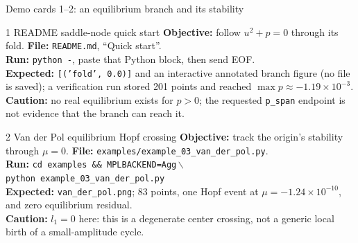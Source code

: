 \begin{frame}{Demo cards 1--2: an equilibrium branch and its stability}
\scriptsize
\begin{block}{1 \quad README saddle-node quick start}
\textbf{Objective:} follow $u^2+p=0$ through its fold.\quad
\textbf{File:} \texttt{README.md}, ``Quick start''.\\
\textbf{Run:} \texttt{python -}, paste that Python block, then send EOF.\\
\textbf{Expected:} \texttt{[('fold', 0.0)]} and an interactive annotated branch figure
(no file is saved); a
verification run stored 201 points and reached $\max p\approx-1.19\times10^{-3}$.\\
\textbf{Caution:} no real equilibrium exists for $p>0$; the requested
\texttt{p\_span} endpoint is not evidence that the branch can reach it.
\end{block}

\begin{block}{2 \quad Van der Pol equilibrium Hopf crossing}
\textbf{Objective:} track the origin's stability through $\mu=0$.\quad
\textbf{File:} \texttt{examples/example\_03\_van\_der\_pol.py}.\\
\textbf{Run:} \texttt{cd examples \&\& MPLBACKEND=Agg}\,$\backslash$\\
\hspace*{8mm}\texttt{python example\_03\_van\_der\_pol.py}\\
\textbf{Expected:} \texttt{van\_der\_pol.png}; 83 points, one Hopf event at
$\mu=-1.24\times10^{-10}$, and zero equilibrium residual.\\
\textbf{Caution:} $l_1=0$ here: this is a degenerate center crossing, not a
generic local birth of a small-amplitude cycle.
\end{block}
\end{frame}

